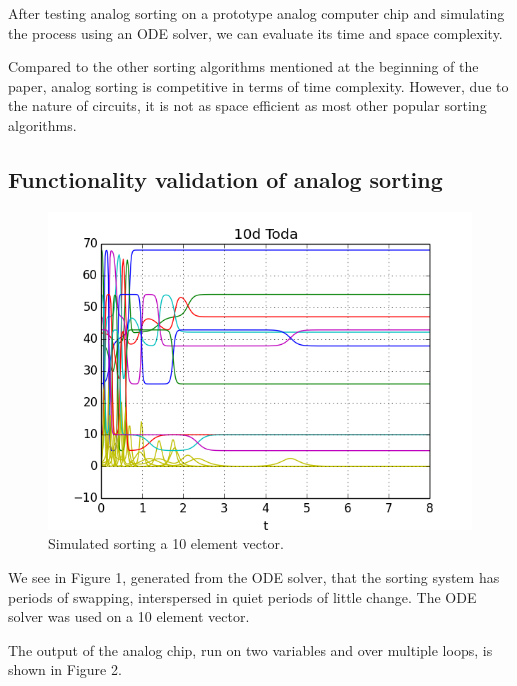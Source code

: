 After testing analog sorting on a prototype analog computer chip and simulating the process using an ODE solver, we can evaluate its time and space complexity. 

Compared to the other sorting algorithms mentioned at the beginning of the paper, analog sorting is competitive in terms of time complexity. However, due to the nature of circuits, it is not as space efficient as most other popular sorting algorithms.

\subsection{Functionality validation of analog sorting}

\begin{figure}[h]
\centering
\includegraphics[width=\columnwidth]{graphics/10d_toda_7.png}
\caption{Simulated sorting a 10 element vector.}
\end{figure}

We see in Figure 1, generated from the ODE solver, that the sorting system has periods of swapping, interspersed in quiet periods of little change. The ODE solver was used on a 10 element vector. 

The output of the analog chip, run on two variables and over multiple loops, is shown in Figure 2.

